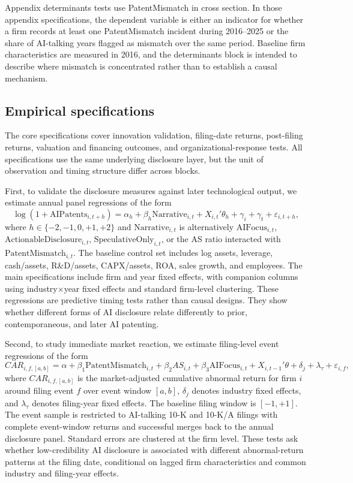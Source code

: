 Appendix determinants tests use PatentMismatch in cross section. In those appendix specifications, the dependent variable is either an indicator for whether a firm records at least one PatentMismatch incident during 2016--2025 or the share of AI-talking years flagged as mismatch over the same period. Baseline firm characteristics are measured in 2016, and the determinants block is intended to describe where mismatch is concentrated rather than to establish a causal mechanism.

\subsection{Empirical specifications}

The core specifications cover innovation validation, filing-date returns, post-filing returns, valuation and financing outcomes, and organizational-response tests. All specifications use the same underlying disclosure layer, but the unit of observation and timing structure differ across blocks.

First, to validate the disclosure measures against later technological output, we estimate annual panel regressions of the form
\[
\log(1+\mathrm{AIPatents}_{i,t+h})
=
\alpha_h + \beta_h \mathrm{Narrative}_{i,t} + X_{i,t}'\theta_h + \gamma_i + \gamma_t + \varepsilon_{i,t+h},
\]
where $h \in \{-2,-1,0,+1,+2\}$ and $\mathrm{Narrative}_{i,t}$ is alternatively $\mathrm{AIFocus}_{i,t}$, $\mathrm{ActionableDisclosure}_{i,t}$, $\mathrm{SpeculativeOnly}_{i,t}$, or the AS ratio interacted with $\mathrm{PatentMismatch}_{i,t}$. The baseline control set includes log assets, leverage, cash/assets, R\&D/assets, CAPX/assets, ROA, sales growth, and employees. The main specifications include firm and year fixed effects, with companion columns using industry$\times$year fixed effects and standard firm-level clustering. These regressions are predictive timing tests rather than causal designs. They show whether different forms of AI disclosure relate differently to prior, contemporaneous, and later AI patenting.

Second, to study immediate market reaction, we estimate filing-level event regressions of the form
\[
CAR_{i,f,[a,b]}
=
\alpha + \beta_1 \mathrm{PatentMismatch}_{i,t}
+ \beta_2 AS_{i,t}
+ \beta_3 \mathrm{AIFocus}_{i,t}
+ X_{i,t-1}'\theta + \delta_{j} + \lambda_{\tau} + \varepsilon_{i,f},
\]
where $CAR_{i,f,[a,b]}$ is the market-adjusted cumulative abnormal return for firm $i$ around filing event $f$ over event window $[a,b]$, $\delta_{j}$ denotes industry fixed effects, and $\lambda_{\tau}$ denotes filing-year fixed effects. The baseline filing window is $[-1,+1]$. The event sample is restricted to AI-talking 10-K and 10-K/A filings with complete event-window returns and successful merges back to the annual disclosure panel. Standard errors are clustered at the firm level. These tests ask whether low-credibility AI disclosure is associated with different abnormal-return patterns at the filing date, conditional on lagged firm characteristics and common industry and filing-year effects.

